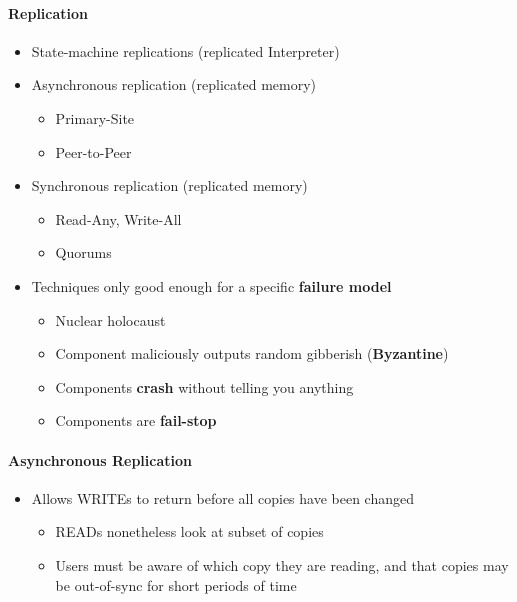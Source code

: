 \paragraph{Replication}
\begin{itemize}
\item State-machine replications (replicated Interpreter)
\item Asynchronous replication (replicated memory)
  \begin{itemize}
  \item Primary-Site
  \item Peer-to-Peer
  \end{itemize}

\item Synchronous replication (replicated memory)
  \begin{itemize}
  \item Read-Any, Write-All
  \item Quorums
  \end{itemize}
\end{itemize}

\begin{itemize}
\item Techniques only good enough for a specific \textbf{failure model}
  \begin{itemize}
  \item Nuclear holocaust
  \item Component maliciously outputs random gibberish
    (\textbf{Byzantine})
  \item Components \textbf{crash} without telling you anything
  \item Components are \textbf{fail-stop}
  \end{itemize}
\end{itemize}

\paragraph{Asynchronous Replication}
\begin{itemize}
\item Allows WRITEs to return before all copies have been changed
  \begin{itemize}
  \item READs nonetheless look at subset of copies
  \item Users must be aware of which copy they are reading,
    and that copies may be out-of-sync for short periods of time
  \end{itemize}
\end{itemize}

